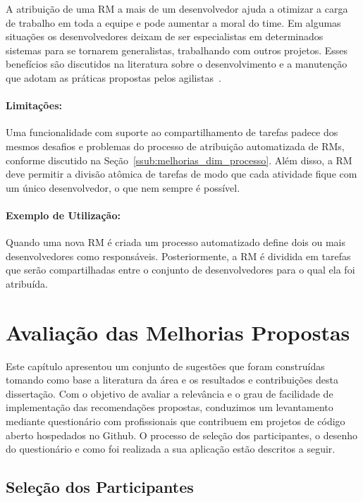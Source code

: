 A atribuição de uma RM a mais de um desenvolvedor ajuda a otimizar a carga de
trabalho em toda a equipe e pode aumentar a moral do time. Em algumas situações
os desenvolvedores deixam de ser especialistas em determinados sistemas para se
tornarem generalistas, trabalhando com outros projetos. Esses benefícios são
discutidos na literatura sobre o desenvolvimento e a manutenção que adotam as
práticas propostas pelos agilistas~\cite{dybaa2008empirical,rudzki2009agile}.

\paragraph{Limitações:}
\label{par:limitacoes_s08}

Uma funcionalidade com suporte ao compartilhamento de tarefas padece dos mesmos
desafios e problemas do processo de atribuição automatizada de RMs, conforme
discutido na Seção~\ref{ssub:melhorias_dim_processo}. Além disso, a RM deve
permitir a divisão atômica de tarefas de modo que cada atividade fique com um
único desenvolvedor, o que nem sempre é possível.

\paragraph{Exemplo de Utilização:}
\label{par:exemplo_de_utilização_s08}

Quando uma nova RM é criada um processo automatizado define dois ou mais
desenvolvedores como responsáveis. Posteriormente, a RM é dividida em tarefas
que serão compartilhadas entre o conjunto de desenvolvedores para o qual ela foi
atribuída.

\section{Avaliação das Melhorias Propostas}
\label{sec:sug_melhoria_avaliacao_das_melhorias}

Este capítulo apresentou um conjunto de sugestões que foram construídas tomando
como base a literatura da área e os resultados e contribuições desta
dissertação. Com o objetivo de avaliar a relevância e o grau de facilidade de
implementação das recomendações propostas, conduzimos um levantamento mediante
questionário com profissionais que contribuem em projetos de código aberto
hospedados no Github. O processo de seleção dos participantes, o desenho do
questionário e como foi realizada a sua aplicação estão descritos a seguir.

\subsection{Seleção dos Participantes}
\label{ssub:sug_melhoria_selecao_participantes}

